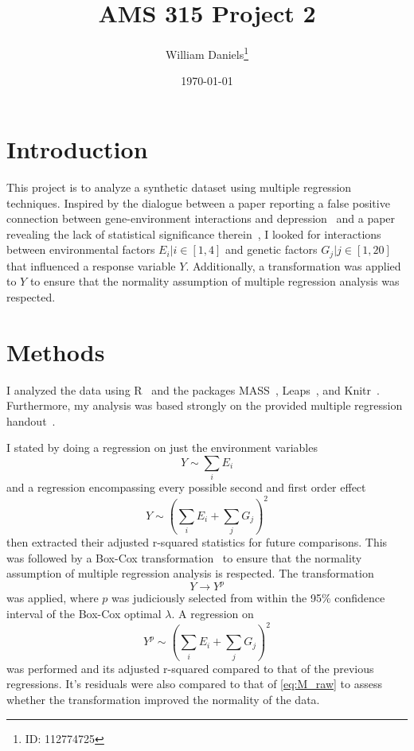 \documentclass[12pt, letterpaper]{article}
\title{AMS 315 Project 2}
\author{William Daniels\thanks{ID: 112774725}}
\date{\today}
\begin{document}
\maketitle

\section{Introduction}
This project is to analyze a synthetic dataset using multiple regression techniques.
Inspired by the dialogue between a paper reporting a false positive connection between gene-environment interactions and depression~\cite{caspi} and a paper revealing the lack of statistical significance therein~\cite{risch}, I looked for interactions between environmental factors \(E_i | i \in [1, 4]\) and genetic factors \(G_j | j \in [1, 20]\) that influenced a response variable \(Y\).
Additionally, a transformation was applied to \(Y\) to ensure that the normality assumption of multiple regression analysis was respected.

\section{Methods}
I analyzed the data using R~\cite{R} and the packages MASS~\cite{MASS}, Leaps~\cite{leaps}, and Knitr~\cite{knitr}.
Furthermore, my analysis was based strongly on the provided multiple regression handout~\cite{handout}.

I stated by doing a regression on just the environment variables
\begin{equation}
    Y \sim \sum_i E_i
    \label{eq:M_E}
\end{equation}
and a regression encompassing every possible second and first order effect
\begin{equation}
    Y \sim \left( \sum_i E_i + \sum_j G_j \right)^2
    \label{eq:M_raw}
\end{equation}
then extracted their adjusted r-squared statistics for future comparisons.
This was followed by a Box-Cox transformation~\cite{boxcox} to ensure that the normality assumption of multiple regression analysis is respected.
The transformation
\begin{equation}
    Y \rightarrow Y^p
    \label{eq:boxcox}
\end{equation}
was applied, where \(p\) was judiciously selected from within the 95\% confidence interval of the Box-Cox optimal \(\lambda\). A regression on
\begin{equation}
    Y^p \sim \left( \sum_i E_i + \sum_j G_j \right)^2
    \label{eq:M_trans}
\end{equation}
was performed and its adjusted r-squared compared to that of the previous regressions.
It's residuals were also compared to that of \eqref{eq:M_raw} to assess whether the transformation improved the normality of the data.
\end{document}
